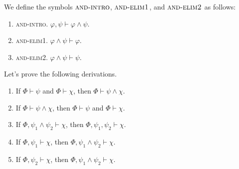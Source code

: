 \begin{definition}
    We define the symbols $\textsc{and-intro}$, $\textsc{and-elim1}$, and $\textsc{and-elim2}$ as follows:
    \begin{enumerate}[itemindent=0ex, itemsep=0pt, label=\upshape{(\alph*)}]
        \item \textsc{and-intro}. $\varphi,\psi\vdash\varphi\wedge\psi$. 
        \item \textsc{and-elim1}. $\varphi\wedge\psi\vdash\varphi$.
        \item \textsc{and-elim2}. $\varphi\wedge\psi\vdash\psi$.
    \end{enumerate}
\end{definition}

\begin{example}\label{eg:and-intro examples}
    Let's prove the following derivations. 
    \begin{enumerate}[itemindent=0ex, itemsep=0pt, label=\upshape{(\alph*)}]
        \item If $\Phi\vdash\psi$ and $\Phi\vdash\chi$, then $\Phi\vdash\psi\wedge\chi$.
        \item If $\Phi\vdash\psi\wedge\chi$, then $\Phi\vdash\psi$ and $\Phi\vdash\chi$.
        \item If $\Phi,\psi_1\wedge\psi_2\vdash\chi$, then $\Phi,\psi_1,\psi_2\vdash\chi$.
        \item If $\Phi, \psi_1\vdash\chi$, then $\Phi, \psi_1\wedge\psi_2\vdash\chi$.
        \item If $\Phi, \psi_2\vdash\chi$, then $\Phi, \psi_1\wedge\psi_2\vdash\chi$.
    \end{enumerate}
\end{example}

